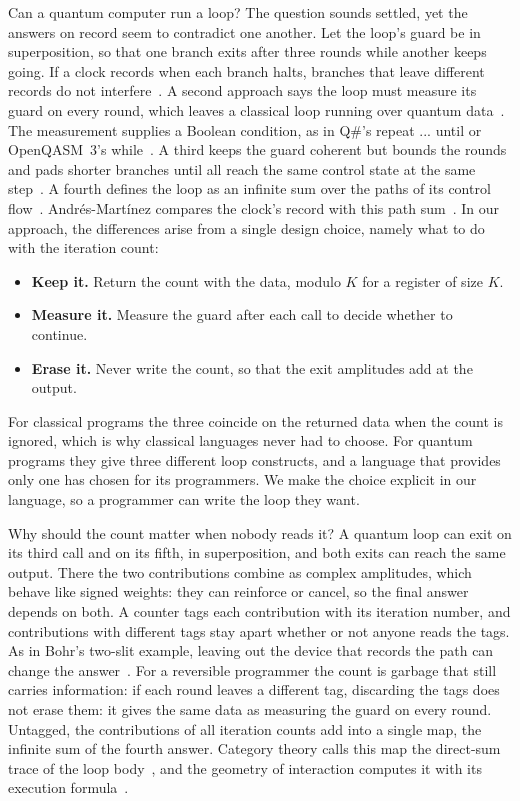 \documentclass[acmsmall,screen,review,anonymous,nonacm]{acmart}
\newcommand{\storyinlineface}{\small\ttfamily}
\newcommand{\code}[1]{\textnormal{\storyinlineface #1}}
\numberwithin{equation}{section}
\begin{document}
Can a quantum computer run a loop? The question sounds settled, yet
the answers on record seem to contradict one another. Let the loop's guard
be in superposition, so that one branch exits after three rounds while
another keeps going. If a clock records when each branch halts, branches
that leave different records do not interfere~\cite{Myers97Halting,LindenPopescu98Halting}.
A second approach says the loop must measure its guard on every round, which leaves a classical loop
running over quantum data~\cite{YingFeng10QuantumLoop}. The measurement supplies a Boolean
condition, as in Q\#'s \code{repeat ... until} or OpenQASM~3's
\code{while}~\cite{QSharpDocsLoops,OpenQASMClassicalInstructions,CrossEtAl22OpenQASM}.
A third keeps
the guard coherent but bounds the rounds and pads shorter branches until
all reach the same control state at the same step~\cite{YuanVillanyiCarbin24QCM,ZhangYing25QRM}. A fourth
defines the loop as an infinite sum over the paths of its control
flow~\cite{Bartha14QuantumTuringAutomata}. Andr\'es-Mart\'inez compares the clock's record with this path sum~\cite[Introduction]{AndresMartinez22Thesis}.
In our approach, the differences arise from a single design choice,
namely what to do with the iteration count:
\begin{itemize}
\item \textbf{Keep it.} Return the count with the data, modulo $K$ for a register of size $K$.
\item \textbf{Measure it.} Measure the guard after each call to decide whether to continue.
\item \textbf{Erase it.} Never write the count, so that the exit amplitudes add at the output.
\end{itemize}
For classical programs the three coincide on the returned data
when the count is ignored, which is why classical languages never
had to choose.
For quantum programs they give three different loop constructs, and a
language that provides only one has chosen for its programmers.
We make the choice explicit in our language, so a programmer can write the loop they want.

Why should the count matter when nobody reads it? A quantum loop can
exit on its third call and on its fifth, in superposition,
and both exits can reach the same output. There the two contributions
combine as complex amplitudes, which behave like signed weights: they
can reinforce or cancel, so the final answer depends on both. A
counter tags each contribution with its iteration number, and
contributions with different tags stay apart whether or not anyone
reads the tags. As in Bohr's two-slit example, leaving out the device that records the path
can change the answer~\cite[Fig.~3]{Bohr49Einstein}.
For a reversible programmer the count is garbage that still carries information:
if each round leaves a different tag, discarding the tags does not erase them: it gives the same
data as measuring the guard on every round.
Untagged, the contributions of all iteration counts
add into a single map, the infinite sum of the fourth answer.
Category theory calls this map the direct-sum trace of the loop
body~\cite{JSV96,Bartha14QuantumTuringAutomata}, and the geometry of
interaction computes it with its execution
formula~\cite{AbramskyHaghverdiScott02GoI}.
\end{document}
